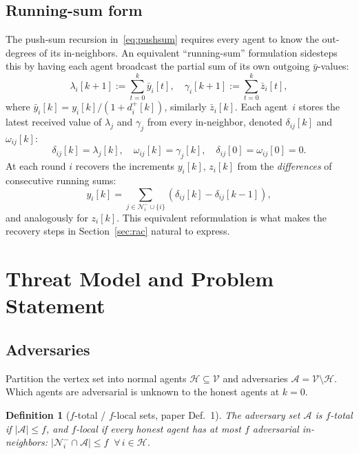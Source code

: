 \documentclass[journal]{IEEEtran}
\newtheorem{definition}{Definition}
\newcommand{\NN}{\mathcal{N}}
\newcommand{\HH}{\mathcal{H}}
\newcommand{\AA}{\mathcal{A}}
\newcommand{\VV}{\mathcal{V}}
\begin{document}
\subsection{Running-sum form}
The push-sum recursion in~\eqref{eq:pushsum} requires every agent to know the
out-degrees of its in-neighbors.  An equivalent ``running-sum'' formulation
\cite{hadjicostis2016robust} sidesteps this by having each agent broadcast
the partial sum of its own outgoing $\bar y$-values:
\begin{equation}
\label{eq:running}
\lambda_i[k+1] := \sum_{t=0}^{k} \bar y_i[t], \quad
\gamma_i[k+1] := \sum_{t=0}^{k} \bar z_i[t],
\end{equation}
where $\bar y_i[k]=y_i[k]/(1+d_i^+[k])$, similarly $\bar z_i[k]$.  Each
agent~$i$ stores the latest received value of $\lambda_j$ and $\gamma_j$ from
every in-neighbor, denoted $\delta_{ij}[k]$ and $\omega_{ij}[k]$:
\begin{equation}
\delta_{ij}[k]=\lambda_j[k], \quad \omega_{ij}[k]=\gamma_j[k], \quad
\delta_{ij}[0]=\omega_{ij}[0]=0.
\end{equation}
At each round $i$ recovers the increments $y_i[k]$, $z_i[k]$ from the
\emph{differences} of consecutive running sums:
\begin{equation}
\label{eq:diff}
y_i[k] = \!\!\sum_{j\in\NN_i^-\cup\{i\}}\!\! (\delta_{ij}[k]-\delta_{ij}[k-1]),
\end{equation}
and analogously for $z_i[k]$.  This equivalent reformulation is what makes
the recovery steps in Section~\ref{sec:rac} natural to express.

\section{Threat Model and Problem Statement}
\label{sec:threat}

\subsection{Adversaries}
Partition the vertex set into normal agents $\HH\subseteq\VV$ and adversaries
$\AA=\VV\setminus\HH$.  Which agents are adversarial is unknown to the honest
agents at $k=0$.

\begin{definition}[$f$-total / $f$-local sets, paper Def.~1]
The adversary set $\AA$ is \emph{$f$-total} if $|\AA|\leq f$, and
\emph{$f$-local} if every honest agent has at most $f$ adversarial
in-neighbors:
$|\NN_i^-\cap\AA|\leq f \;\;\forall\, i\in\HH$.
\end{definition}
\end{document}
